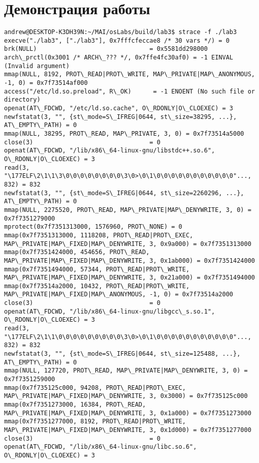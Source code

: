 \documentclass[a4paper, 12pt]{article}
\begin{document}
\section{Демонстрация работы}
\begin{lstlisting}
andrew@DESKTOP-K3DH39N:~/MAI/osLabs/build/lab3$ strace -f ./lab3
execve("./lab3", ["./lab3"], 0x7fffcfeccae8 /* 30 vars */) = 0
brk(NULL)                               = 0x5581dd298000
arch\_prctl(0x3001 /* ARCH\_??? */, 0x7ffe4fc30af0) = -1 EINVAL (Invalid argument)
mmap(NULL, 8192, PROT\_READ|PROT\_WRITE, MAP\_PRIVATE|MAP\_ANONYMOUS, -1, 0) = 0x7f73514af000
access("/etc/ld.so.preload", R\_OK)      = -1 ENOENT (No such file or directory)
openat(AT\_FDCWD, "/etc/ld.so.cache", O\_RDONLY|O\_CLOEXEC) = 3
newfstatat(3, "", {st\_mode=S\_IFREG|0644, st\_size=38295, ...}, AT\_EMPTY\_PATH) = 0
mmap(NULL, 38295, PROT\_READ, MAP\_PRIVATE, 3, 0) = 0x7f73514a5000
close(3)                                = 0
openat(AT\_FDCWD, "/lib/x86\_64-linux-gnu/libstdc++.so.6", O\_RDONLY|O\_CLOEXEC) = 3
read(3, "\177ELF\2\1\1\3\0\0\0\0\0\0\0\0\3\0>\0\1\0\0\0\0\0\0\0\0\0\0\0"..., 832) = 832
newfstatat(3, "", {st\_mode=S\_IFREG|0644, st\_size=2260296, ...}, AT\_EMPTY\_PATH) = 0
mmap(NULL, 2275520, PROT\_READ, MAP\_PRIVATE|MAP\_DENYWRITE, 3, 0) = 0x7f7351279000
mprotect(0x7f7351313000, 1576960, PROT\_NONE) = 0
mmap(0x7f7351313000, 1118208, PROT\_READ|PROT\_EXEC, MAP\_PRIVATE|MAP\_FIXED|MAP\_DENYWRITE, 3, 0x9a000) = 0x7f7351313000
mmap(0x7f7351424000, 454656, PROT\_READ, MAP\_PRIVATE|MAP\_FIXED|MAP\_DENYWRITE, 3, 0x1ab000) = 0x7f7351424000
mmap(0x7f7351494000, 57344, PROT\_READ|PROT\_WRITE, MAP\_PRIVATE|MAP\_FIXED|MAP\_DENYWRITE, 3, 0x21a000) = 0x7f7351494000
mmap(0x7f73514a2000, 10432, PROT\_READ|PROT\_WRITE, MAP\_PRIVATE|MAP\_FIXED|MAP\_ANONYMOUS, -1, 0) = 0x7f73514a2000
close(3)                                = 0
openat(AT\_FDCWD, "/lib/x86\_64-linux-gnu/libgcc\_s.so.1", O\_RDONLY|O\_CLOEXEC) = 3
read(3, "\177ELF\2\1\1\0\0\0\0\0\0\0\0\0\3\0>\0\1\0\0\0\0\0\0\0\0\0\0\0"..., 832) = 832
newfstatat(3, "", {st\_mode=S\_IFREG|0644, st\_size=125488, ...}, AT\_EMPTY\_PATH) = 0
mmap(NULL, 127720, PROT\_READ, MAP\_PRIVATE|MAP\_DENYWRITE, 3, 0) = 0x7f7351259000
mmap(0x7f735125c000, 94208, PROT\_READ|PROT\_EXEC, MAP\_PRIVATE|MAP\_FIXED|MAP\_DENYWRITE, 3, 0x3000) = 0x7f735125c000
mmap(0x7f7351273000, 16384, PROT\_READ, MAP\_PRIVATE|MAP\_FIXED|MAP\_DENYWRITE, 3, 0x1a000) = 0x7f7351273000
mmap(0x7f7351277000, 8192, PROT\_READ|PROT\_WRITE, MAP\_PRIVATE|MAP\_FIXED|MAP\_DENYWRITE, 3, 0x1d000) = 0x7f7351277000
close(3)                                = 0
openat(AT\_FDCWD, "/lib/x86\_64-linux-gnu/libc.so.6", O\_RDONLY|O\_CLOEXEC) = 3

\end{lstlisting}
\end{document}

